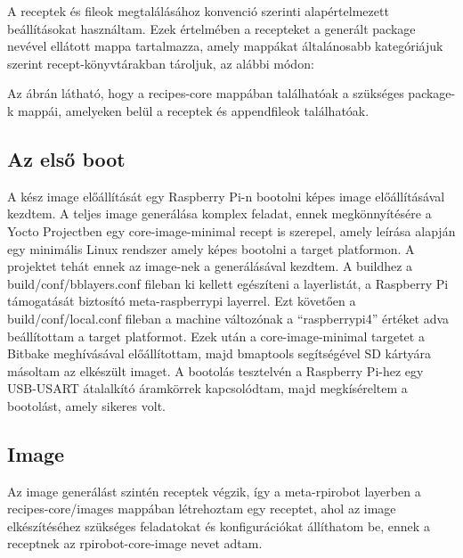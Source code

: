 A receptek és fileok megtalálásához konvenció szerinti alapértelmezett
beállításokat használtam. Ezek értelmében a recepteket a generált package nevével
ellátott mappa tartalmazza, amely mappákat általánosabb kategóriájuk szerint
recept-könyvtárakban tároljuk, az alábbi módon:


Az ábrán látható, hogy a recipes-core mappában találhatóak a szükséges package-k
mappái, amelyeken belül a receptek és appendfileok találhatóak. 

\subsection{Az első boot}

A kész image előállítását egy Raspberry Pi-n bootolni képes image előállításával
kezdtem. A teljes image generálása komplex feladat, ennek megkönnyítésére a Yocto
Projectben egy core-image-minimal recept is szerepel, amely leírása alapján egy
minimális Linux rendszer amely képes bootolni a target platformon. A projektet
tehát ennek az image-nek a generálásával kezdtem. A buildhez a
build/conf/bblayers.conf fileban ki kellett egészíteni a layerlistát, a Raspberry
Pi támogatását biztosító meta-raspberrypi layerrel. Ezt követően a
build/conf/local.conf fileban a machine változónak a ``raspberrypi4'' értéket
adva beállítottam a target platformot. Ezek után a core-image-minimal targetet a
Bitbake meghívásával előállítottam, majd bmaptools segítségével SD kártyára
másoltam az elkészült imaget. A bootolás tesztelvén a Raspberry Pi-hez egy
USB-USART átalalkító áramkörrek kapcsolódtam, majd megkíséreltem a bootolást,
amely sikeres volt.

\subsection{Image}

Az image generálást szintén receptek végzik, így a meta-rpirobot layerben a
recipes-core/images mappában létrehoztam egy receptet, ahol az image
elkészítéséhez szükséges feladatokat és konfigurációkat állíthatom be, ennek a
receptnek az rpirobot-core-image nevet adtam.

